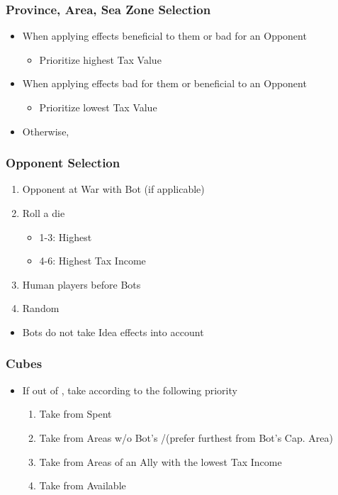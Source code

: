 \documentclass[10pt]{article}
\begin{document}
\subsubsection*{Province, Area, Sea Zone Selection}
\begin{itemize}
	\item When applying effects beneficial to them or bad for an Opponent
	\begin{itemize}
		\item Prioritize highest Tax Value
	\end{itemize}
	\item When applying effects bad for them or beneficial to an Opponent
	\begin{itemize}
		\item Prioritize lowest Tax Value
	\end{itemize}
	\item Otherwise, \az
\end{itemize}

\subsubsection*{Opponent Selection}
\begin{enumerate}
	\item Opponent at War with Bot (if applicable)
	\item Roll a die
	\begin{itemize}
		\item 1-3: Highest \prestige
		\item 4-6: Highest Tax Income
	\end{itemize}
	\item Human players before Bots
	\item Random	
\end{enumerate}

\begin{itemize}
	\item Bots do not take Idea effects into account
\end{itemize}

\subsubsection*{Cubes}
\begin{itemize}
	\item If out of \cubes, take according to the following priority
	\begin{enumerate}
		\item Take \cubes from Spent \botpower
		\item Take \influence from Areas w/o Bot's \alliance/\marriage (prefer furthest from Bot's Cap. Area)
		\item Take from Areas of an Ally with the lowest Tax Income
		\item Take from Available \botpower
	\end{enumerate}
\end{itemize}
\end{document}
